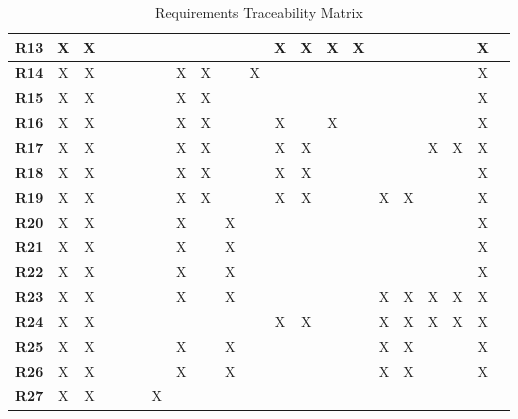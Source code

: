 \begin{table}[H]
{\begin{tabular}{|c|c|c|c|c|c|c|c|c|c|c|c|c|c|c|c|c|c|c|c|c|}
        \textbf{R13} & X & X &   &   &   &   &   &   &   &   & X & X & X & X &   &   &   &   & X \\ \hline
        \textbf{R14} & X & X &   &   &   &   & X & X &   & X &   &   &   &   &   &   &   &   & X \\ \hline
        \textbf{R15} & X & X &   &   &   &   & X & X &   &   &   &   &   &   &   &   &   &   & X \\ \hline
        \textbf{R16} & X & X &   &   &   &   & X & X &   &   & X &   & X &   &   &   &   &   & X \\ \hline
        \textbf{R17} & X & X &   &   &   &   & X & X &   &   & X & X &   &   &   &   & X & X & X \\ \hline
        \textbf{R18} & X & X &   &   &   &   & X & X &   &   & X & X &   &   &   &   &   &   & X \\ \hline
        \textbf{R19} & X & X &   &   &   &   & X & X &   &   & X & X &   &   & X & X &   &   & X \\ \hline
        \textbf{R20} & X & X &   &   &   &   & X &   & X &   &   &   &   &   &   &   &   &   & X \\ \hline
        \textbf{R21} & X & X &   &   &   &   & X &   & X &   &   &   &   &   &   &   &   &   & X \\ \hline
        \textbf{R22} & X & X &   &   &   &   & X &   & X &   &   &   &   &   &   &   &   &   & X \\ \hline
        \textbf{R23} & X & X &   &   &   &   & X &   & X &   &   &   &   &   & X & X & X & X & X \\ \hline
        \textbf{R24} & X & X &   &   &   &   &   &   &   &   & X & X &   &   & X & X & X & X & X \\ \hline
        \textbf{R25} & X & X &   &   &   &   & X &   & X &   &   &   &   &   & X & X &   &   & X  \\ \hline
        \textbf{R26} & X & X &   &   &   &   & X &   & X &   &   &   &   &   & X & X &   &   & X \\ \hline
        \textbf{R27} & X & X &   &   &   & X &   &   &   &   &   &   &   &   &   &   &   &   &   \\ \hline
    \end{tabular}}
    \caption{Requirements Traceability Matrix}
    \label{tab:requirements_traceability}
\end{table}